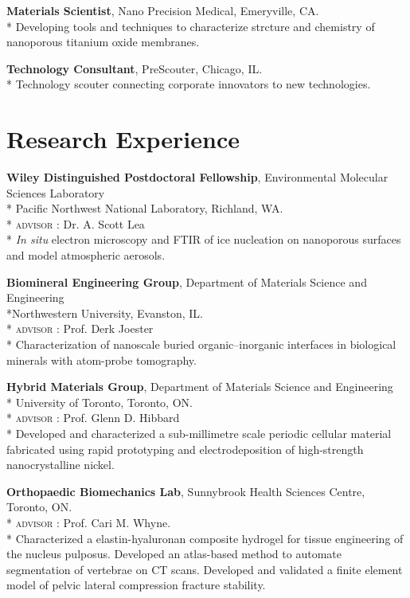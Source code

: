 \textbf{Materials Scientist}, Nano Precision Medical, Emeryville, CA.\\*
Developing tools and techniques to characterize strcture and chemistry of nanoporous titanium oxide membranes.

\textbf{Technology Consultant}, PreScouter, Chicago, IL.\\*
Technology scouter connecting corporate innovators to new technologies.  

\section*{Research Experience}
\textbf{Wiley Distinguished Postdoctoral Fellowship}, Environmental Molecular Sciences Laboratory\\* Pacific Northwest National Laboratory, Richland, WA.\\*
\begingroup\setlength{\parskip}{0.2cm}
\textsc{advisor} : Dr. A. Scott Lea \\*
\emph{In situ} electron microscopy and FTIR of ice nucleation on nanoporous surfaces and model atmospheric aerosols.

\textbf{Biomineral Engineering Group}, Department of Materials Science and Engineering\\*Northwestern University, Evanston, IL.\\*
\begingroup\setlength{\parskip}{0.2cm}
\textsc{advisor} : Prof. Derk Joester\\*
Characterization of nanoscale buried organic--inorganic interfaces in biological minerals with atom-probe tomography.

\textbf{Hybrid Materials Group}, Department of Materials Science and Engineering\\* University of Toronto, Toronto, ON.\\*
\textsc{advisor} : Prof. Glenn D. Hibbard\\*
Developed and characterized a sub-millimetre scale periodic cellular material fabricated using rapid prototyping and electrodeposition of high-strength nanocrystalline nickel.

\textbf{Orthopaedic Biomechanics Lab}, Sunnybrook Health Sciences Centre, Toronto, ON.\\*
\textsc{advisor} : Prof. Cari M. Whyne.\\*
Characterized a elastin-hyaluronan composite hydrogel for tissue engineering of the nucleus pulposus. Developed an atlas-based method to automate segmentation of vertebrae on CT scans. Developed and validated a finite element model of pelvic lateral compression fracture stability.

